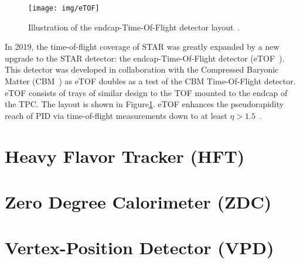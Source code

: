 \begin{figure}[!htb]
\begin{center}
 \texttt{[image: img/eTOF]}\\
\end{center}
\caption{\label{eTOF}Illustration of the endcap-Time-Of-Flight detector layout~\cite{eTOF}. }
\end{figure}

In 2019, the time-of-flight coverage of STAR was greatly expanded by a new upgrade to the STAR detector: the endcap-Time-Of-Flight detector (eTOF~\cite{eTOF})\@. This detector was developed in collaboration with the Compressed Baryonic Matter (CBM~\cite{CBM}) as eTOF doubles as a test of the CBM Time-Of-Flight detector. eTOF consists of trays of similar design to the TOF mounted to the endcap of the TPC\@. The layout is shown in Figure\ref{eTOF}\@. eTOF enhances the pseudorapidity reach of PID via time-of-flight measurements down to at least $\eta > 1.5$~\cite{eTOF_LOI}\@.


\section{Heavy Flavor Tracker (HFT)\label{HFTsection}} 




\section{Zero Degree Calorimeter (ZDC)\label{ZDCsection}} 






\section{Vertex-Position Detector (VPD)\label{VPD}}

